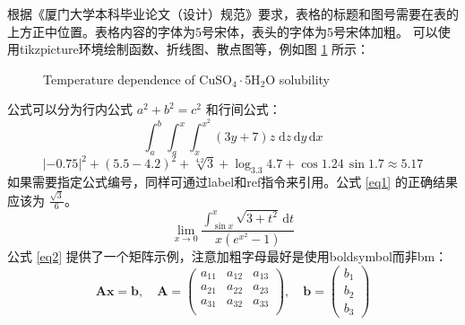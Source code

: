 \documentclass{xmu}
\begin{document}
根据《厦门大学本科毕业论文（设计）规范》\cite{xmuthesis}要求，表格的标题和图号需要在表的上方正中位置。表格内容的字体为5号宋体，表头的字体为5号宋体加粗。
可以使用tikzpicture环境绘制函数、折线图、散点图等，例如图 \ref{plot} 所示：
\begin{figure}[!htbp]
    \centering
    \caption{Temperature dependence of CuSO\(_4\cdot\)5H\(_2\)O solubility}\label{plot}
\end{figure}
公式可以分为行内公式 $a^2+b^2=c^2$ 和行间公式：
$$
    \int_a^b\int_a^x\int_x^{x^2}(3y+7)z\;\mathrm{d}z\,\mathrm{d}y\,\mathrm{d}x
$$
$$
    |-0.75|^{2}+(5.5-4.2)^2+\sqrt[4.2]{3}+\log_{3.3}{4.7}+\cos1.24\,\sin1.7\approx5.17
$$
如果需要指定公式编号，同样可通过label和ref指令来引用。公式 \ref{eq1} 的正确结果应该为 $\frac{\sqrt{3}}{6}$。
\begin{equation}\label{eq1}
    \lim_{x\to0}\frac{\displaystyle{\int_{\sin x}^x\sqrt{3+t^2}\,\mathrm{d}t}}{x(e^{x^2}-1)}
\end{equation}
公式 \ref{eq2} 提供了一个矩阵示例，注意加粗字母最好是使用boldsymbol而非bm：
\begin{equation}\label{eq2}
    \boldsymbol{Ax} = \boldsymbol{b},\quad\boldsymbol{A} = \left(\begin{array}{ccc}
            a_{11} & a_{12} & a_{13} \\
            a_{21} & a_{22} & a_{23} \\
            a_{31} & a_{32} & a_{33} \\
        \end{array}\right),\quad \boldsymbol{b}=\left(\begin{array}{c}
            b_1 \\ b_2 \\ b_3\end{array}\right)
\end{equation}
\end{document}
